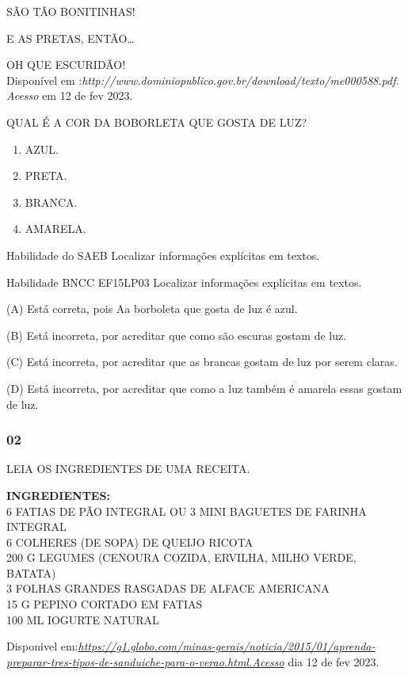 \begin{escola}
SÃO TÃO BONITINHAS!

E AS PRETAS, ENTÃO\ldots{}

OH QUE ESCURIDÃO!\\
Disponível em
:\emph{http://www.dominiopublico.gov.br/download/texto/me000588.pdf.
Acesso} em 12 de fev 2023.

QUAL É A COR DA BOBORLETA QUE GOSTA DE LUZ?

\begin{enumerate}
\def\labelenumi{\Alph{enumi})}
\item
  AZUL.
\item
  PRETA.
\item
  BRANCA.
\item
  AMARELA.
\end{enumerate}

\protect\hypertarget{_heading=h.z337ya}{}{}Habilidade do SAEB Localizar
informações explícitas em textos.

Habilidade BNCC EF15LP03 Localizar informações explícitas em textos.

(A) Está correta, pois Aa borboleta que gosta de luz é azul.

(B) Está incorreta, por acreditar que como são escuras gostam de luz.

(C) Está incorreta, por acreditar que as brancas gostam de luz por serem
claras.

(D) Está incorreta, por acreditar que como a luz também é amarela essas
gostam de luz.

\subsubsection{02}\label{section-9}

LEIA OS INGREDIENTES DE UMA RECEITA.

\textbf{INGREDIENTES:}\\
6 FATIAS DE PÃO INTEGRAL OU 3 MINI BAGUETES DE FARINHA INTEGRAL\\
6 COLHERES (DE SOPA) DE QUEIJO RICOTA\\
200 G LEGUMES (CENOURA COZIDA, ERVILHA, MILHO VERDE, BATATA)\\
3 FOLHAS GRANDES RASGADAS DE ALFACE AMERICANA\\
15 G PEPINO CORTADO EM FATIAS\\
100 ML IOGURTE NATURAL

Disponivel
em:\href{https://g1.globo.com/minas-gerais/noticia/2015/01/aprenda-preparar-tres-tipos-de-sanduiche-para-o-verao.html.Acesso}{\emph{https://g1.globo.com/minas-gerais/noticia/2015/01/aprenda-preparar-tres-tipos-de-sanduiche-para-o-verao.html.Acesso}}
dia 12 de fev 2023.


\end{escola}
